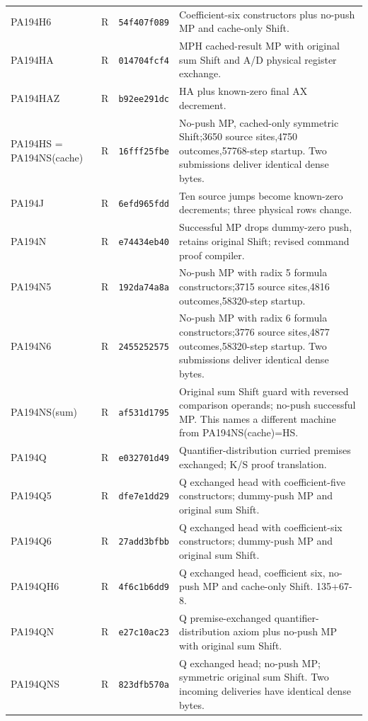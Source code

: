 \begin{longtable}{@{}p{3.3cm}p{1.3cm}p{1.9cm}p{9.1cm}@{}}
PA194H6 & R & \texttt{54f407f089} & Coefficient-six constructors plus no-push MP and cache-only Shift.\\[4pt]
PA194HA & R & \texttt{014704fcf4} & MPH cached-result MP with original sum Shift and A/D physical register exchange.\\[4pt]
PA194HAZ & R & \texttt{b92ee291dc} & HA plus known-zero final AX decrement.\\[4pt]
PA194HS = PA194NS(cache) & R & \texttt{16fff25fbe} & No-push MP, cached-only symmetric Shift;3650 source sites,4750 outcomes,57768-step startup. Two submissions deliver identical dense bytes.\\[4pt]
PA194J & R & \texttt{6efd965fdd} & Ten source jumps become known-zero decrements; three physical rows change.\\[4pt]
PA194N & R & \texttt{e74434eb40} & Successful MP drops dummy-zero push, retains original Shift; revised command proof compiler.\\[4pt]
PA194N5 & R & \texttt{192da74a8a} & No-push MP with radix 5 formula constructors;3715 source sites,4816 outcomes,58320-step startup.\\[4pt]
PA194N6 & R & \texttt{2455252575} & No-push MP with radix 6 formula constructors;3776 source sites,4877 outcomes,58320-step startup. Two submissions deliver identical dense bytes.\\[4pt]
PA194NS(sum) & R & \texttt{af531d1795} & Original sum Shift guard with reversed comparison operands; no-push successful MP. This names a different machine from PA194NS(cache)=HS.\\[4pt]
PA194Q & R & \texttt{e032701d49} & Quantifier-distribution curried premises exchanged; K/S proof translation.\\[4pt]
PA194Q5 & R & \texttt{dfe7e1dd29} & Q exchanged head with coefficient-five constructors; dummy-push MP and original sum Shift.\\[4pt]
PA194Q6 & R & \texttt{27add3bfbb} & Q exchanged head with coefficient-six constructors; dummy-push MP and original sum Shift.\\[4pt]
PA194QH6 & R & \texttt{4f6c1b6dd9} & Q exchanged head, coefficient six, no-push MP and cache-only Shift. 135+67-8.\\[4pt]
PA194QN & R & \texttt{e27c10ac23} & Q premise-exchanged quantifier-distribution axiom plus no-push MP with original sum Shift.\\[4pt]
PA194QNS & R & \texttt{823dfb570a} & Q exchanged head; no-push MP; symmetric original sum Shift. Two incoming deliveries have identical dense bytes.\\[4pt]

\end{longtable}
